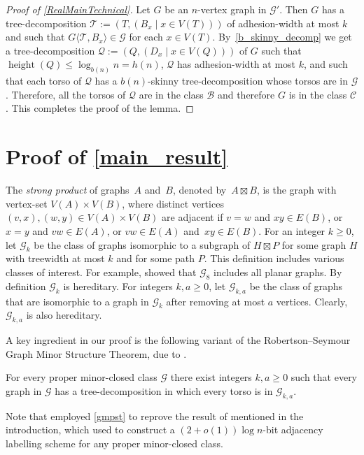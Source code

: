 \documentclass{patmorin}
\renewcommand{\le}{\leqslant}
\renewcommand{\geq}{\geqslant}
\newcommand{\defin}[1]{\emph{\textcolor{brightmaroon}{#1}}}
\newcommand{\torso}[2]{{#1}\langle{#2}\rangle}
\DeclareMathOperator{\height}{height}
\newcommand{\calB}{\mathcal{B}}
\newcommand{\calC}{\mathcal{C}}
\newcommand{\calG}{\mathcal{G}}
\newcommand{\calQ}{\mathcal{Q}}
\newcommand{\calT}{\mathcal{T}}
\begin{document}
\begin{proof}[Proof of \cref{RealMainTechnical}]
    Let $G$ be an $n$-vertex graph in $\calG'$.
    Then $G$ has a tree-decomposition $\calT:=(T,(B_x\mid x\in V(T)))$ of adhesion-width at most $k$ and such that $\torso{G}{\calT,B_x}\in\calG$ for each $x\in V(T)$.
By~\cref{b_skinny_decomp} we get a tree-decomposition $\calQ:=(Q,(D_x \mid x\in V(Q)))$ of $G$ such that $\height(Q)\le\log_{b(n)} n = h(n)$, $\calQ$ has adhesion-width at most $k$, and such that each torso of $\calQ$ has a $b(n)$-skinny tree-decomposition whose torsos are in $\calG$. 
Therefore, all the torsos of $\calQ$ are in the class $\calB$ and therefore $G$ is in the class $\calC$.  This completes the proof of the lemma.
\end{proof}


  \section{Proof of \cref{main_result}}
  \label{gpmst_section}

The \defin{strong product} of graphs~$A$ and~$B$, denoted by~${A \boxtimes B}$, is the graph with vertex-set ${V(A) \times V(B)}$, where distinct vertices ${(v,x),(w,y) \in V(A) \times V(B)}$ are adjacent if
	${v=w}$ and ${xy \in E(B)}$, or
	${x=y}$ and ${vw \in E(A)}$, or
	${vw \in E(A)}$ and~${xy \in E(B)}$.
For an integer $k\geq 0$, let \defin{$\calG_{k}$} be the class of graphs isomorphic to a subgraph of $H\boxtimes P$ for some graph $H$ with treewidth at most $k$ and for some path $P$. This definition includes various classes of interest. For example, \citet{dujmovic.joret.ea:planar} showed that
$\calG_{8}$ includes all planar graphs. 
By definition $\calG_k$ is hereditary.
For integers $k,a\geq 0$, let \defin{$\calG_{k,a}$} be the class of graphs that are isomorphic to a graph in $\calG_k$ after removing at most $a$ vertices.
Clearly, $\calG_{k,a}$ is also hereditary.

A key ingredient in our proof is the following variant of the Robertson--Seymour Graph Minor Structure Theorem, due to \citet{dujmovic.joret.ea:planar}.
 \begin{thm}
  \label{gmpst}
  For every proper minor-closed class $\calG$ there exist integers $k,a\geq 0$ such that every graph in $\calG$ has a tree-decomposition in which every torso is in $\calG_{k,a}$.
  \end{thm}

Note that \citet{dujmovic.joret.ea:planar} employed \cref{gmpst} to reprove the result of \citet{devos2004} mentioned in the introduction, which \citet{gavoille.labourel:shorter} used to construct a ${(2+o(1))\log n}$-bit adjacency labelling scheme for any proper minor-closed class.
\end{document}
